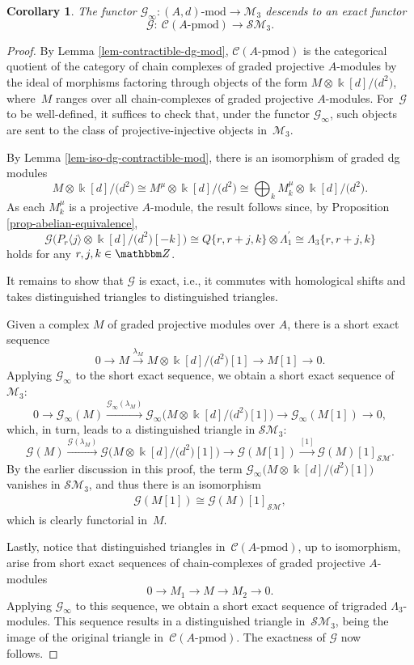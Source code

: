 \documentclass[pdftex]{sigma}
\newtheorem{cor}[thm]{Corollary}
\theoremstyle{definition}
\numberwithin{equation}{section}
\def\Z{{\mathbbm Z}}
\def\lra{{\longrightarrow}}
\def\dmod{{\mathrm{\mbox{-}mod}}} %
\def\pmod{{\mathrm{\mbox{-}pmod}}} %
\def\mc{\mathcal}
\begin{document}
\begin{cor}\label{cor-functor-G}
The functor $\mc{G}_\infty\colon (A,d)\dmod\lra \mc{M}_3$ descends to an exact functor
\[
\mc{G}\colon \ \mc{C}(A\pmod)\lra \mc{SM}_3.
\]
\end{cor}
\begin{proof}By Lemma \ref{lem-contractible-dg-mod}, $\mc{C}(A\pmod)$ is the categorical quotient of the category of chain complexes of graded projective $A$-modules by the ideal of morphisms factoring through objects of the form $M\otimes\Bbbk[d]/\big(d^2\big)$, where~$M$ ranges over all chain-complexes of graded projective $A$-modules. For~$\mc{G}$ to be well-defined, it suffices to check that, under the functor $\mc{G}_\infty$, such objects are sent to the class of projective-injective objects in~$\mc{M}_3$.

By Lemma \ref{lem-iso-dg-contractible-mod}, there is an isomorphism of graded dg modules
\[
M\otimes \Bbbk[d]/\big(d^2\big)\cong M^\mu \otimes \Bbbk[d]/\big(d^2\big)\cong \bigoplus_k M^\mu_k \otimes \Bbbk[d]/\big(d^2\big).
\]
As each $M^\mu_k$ is a projective $A$-module, the result follows since, by Proposition \ref{prop-abelian-equivalence},
\[
\mc{G}\big(P_{r}\langle j\rangle \otimes \Bbbk[d]/\big(d^2\big)[-k]\big)\cong Q\{r,r+j,k\}\otimes \Lambda_1^\prime \cong \Lambda_3\{r,r+j,k\}
\]
holds for any $r,j,k\in \Z$.

It remains to show that $\mc{G}$ is exact, i.e., it commutes with homological shifts and takes distinguished triangles to distinguished triangles.

Given a complex $M$ of graded projective modules over $A$, there is a short exact sequence
\[
0\lra M \stackrel{\lambda_M}{\lra} M\otimes \Bbbk[d]/\big(d^2\big)[1] \lra M[1]\lra 0.
\]
Applying $\mc{G}_\infty$ to the short exact sequence, we obtain a short exact sequence of $\mc{M}_3$:
\[
0\lra \mc{G}_\infty(M) \xrightarrow{ \mc{G}_\infty(\lambda_M)} \mc{G}_\infty \big(M\otimes \Bbbk[d]/\big(d^2\big)[1]\big) \lra \mc{G}_\infty( M[1])\lra 0,
\]
which, in turn, leads to a distinguished triangle in $\mc{SM}_3$:
\[
 \mc{G}(M) \xrightarrow{ \mc{G}(\lambda_M)} \mc{G} \big(M\otimes \Bbbk[d]/\big(d^2\big)[1]\big) \lra \mc{G}( M[1]) \stackrel{[1]}{\lra} \mc{G}(M)[1]_{\mc{SM}}.
\]
By the earlier discussion in this proof, the term $ \mc{G}_\infty \big(M\otimes \Bbbk[d]/\big(d^2\big)[1]\big)$ vanishes in $\mc{SM}_3$, and thus there is an isomorphism
\begin{gather*}
\mc{G}( M[1]) \cong \mc{G}(M)[1]_{\mc{SM}},
\end{gather*}
which is clearly functorial in~$M$.

Lastly, notice that distinguished triangles in~$\mc{C}(A\pmod)$, up to isomorphism, arise from short exact sequences of chain-complexes of graded projective $A$-modules
\[
0\lra M_1\lra M \lra M_2\lra 0.
\]
Applying $\mc{G}_\infty$ to this sequence, we obtain a short exact sequence of trigraded $\Lambda_3$-modules. This sequence results in a distinguished triangle in~$\mc{SM}_3$, being the image of the original triangle in~$\mc{C}(A\pmod)$. The exactness of $\mc{G}$ now follows.
\end{proof}
\end{document}
